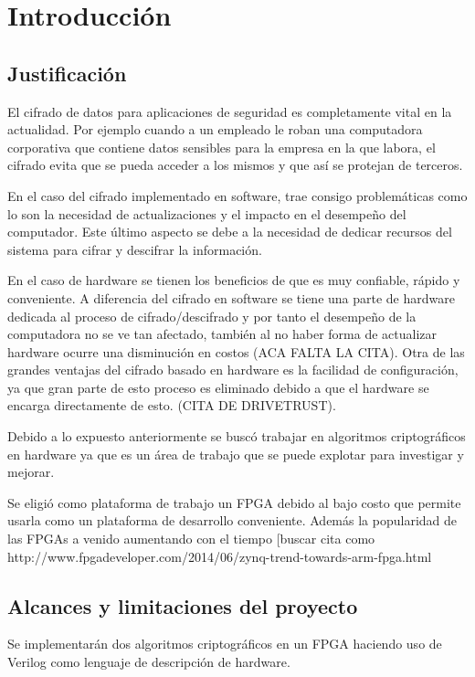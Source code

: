 \chapter{Introducción}

\section{Justificación}
El cifrado de datos para aplicaciones de seguridad es completamente vital en la actualidad. Por ejemplo cuando a un empleado le roban una computadora corporativa que contiene datos sensibles para la empresa en la que labora, el cifrado evita que se pueda acceder a los mismos y que así se protejan de terceros.

En el caso del cifrado implementado en software, trae consigo problemáticas como lo son la necesidad de actualizaciones y el impacto en el desempeño del computador. Este último aspecto se debe a la necesidad de dedicar recursos del sistema para cifrar y descifrar la información. 

En el caso de hardware se tienen los beneficios de que es muy confiable, rápido y conveniente. A diferencia del cifrado en software se tiene una parte de hardware dedicada al proceso de cifrado/descifrado y por tanto el desempeño de la computadora no se ve tan afectado, también al no haber forma de actualizar hardware ocurre una disminución en costos (ACA FALTA LA CITA). Otra de las grandes ventajas del cifrado basado en hardware es la facilidad de configuración, ya que gran parte de esto proceso es eliminado debido a que el hardware se encarga directamente de esto. (CITA DE DRIVETRUST).

Debido a lo expuesto anteriormente se buscó trabajar en algoritmos criptográficos en hardware ya que es un área de trabajo que se puede explotar para investigar y mejorar.

Se eligió como plataforma de trabajo un FPGA debido al bajo costo que permite usarla como un plataforma de desarrollo conveniente. Además la popularidad de las FPGAs a venido aumentando con el tiempo [buscar cita como http://www.fpgadeveloper.com/2014/06/zynq-trend-towards-arm-fpga.html 


\section{Alcances y limitaciones del proyecto}
Se implementarán dos algoritmos criptográficos en un FPGA haciendo uso de Verilog como lenguaje de descripción de hardware. 

